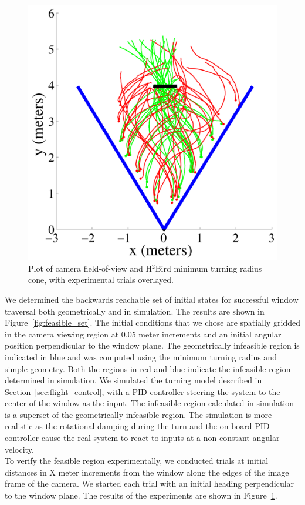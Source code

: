\documentclass{aamas2013}
\begin{document}
\begin{figure}[h]
\hspace{0.5cm}
\begin{minipage}[b]{0.45\linewidth}
\centering
\includegraphics[width=\textwidth]{figures/flight_paths.pdf}
\caption{Plot of camera field-of-view and H$^2$Bird minimum turning radius 
cone, with experimental trials overlayed.}
\label{fig:flight_paths}
\end{minipage}

\end{figure}

We determined the backwards reachable set of initial states for successful
window traversal both geometrically and in simulation. The results are shown
in Figure~\ref{fig:feasible_set}. The initial conditions that we chose are
spatially gridded in the camera viewing region at 0.05 meter increments and an
initial angular position perpendicular to the window plane. The geometrically
infeasible region is indicated in blue and was computed using the minimum
turning radius and simple geometry. Both the regions in red and blue indicate
the infeasible region determined in simulation. We simulated the turning model
described in Section~\ref{sec:flight_control}, with a PID controller steering
the system to the center of the window as the input. The infeasible region
calculated in simulation is a superset of the geometrically infeasible region.
The simulation is more realistic as the rotational damping during the turn and
the on-board PID controller cause the real system to react to inputs at a
non-constant angular velocity.
\\
To verify the feasible region experimentally, we conducted trials at initial
distances in X meter increments from the window along the edges of the image
frame of the camera. We started each trial with an initial heading
perpendicular to the window plane. The results of the experiments are shown in
Figure~\ref{fig:flight_paths}.
\\
\end{document}
